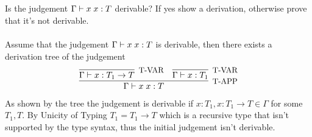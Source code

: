 \subsection{}

Is the judgement $\Gamma \vdash x\;x: T$ derivable? If yes show a
derivation, otherwise prove that it's not derivable.\\~\\
Assume that the judgement $\Gamma \vdash x\;x: T$ is derivable,
then there exists a derivation tree of the judgement
\begin{align*}
	\infer[\text{\small{T-APP}}]
	{\Gamma \vdash \APP{x}{x}: T}
	{
	\infer[\text{\small{T-VAR}}]{\Gamma \vdash x: T_1 \to T}{} &
		\infer[\text{\small{T-VAR}}]{\Gamma \vdash x: T_1}{}
	}
\end{align*}
As shown by the tree the judgement is derivable if
$x: T_1, x: T_1 \to T \in \Gamma$ for some $T_1, T$.
By Unicity of Typing $T_1 = T_1 \to T$ which is a recursive type that isn't
supported by the type syntax, thus the initial judgement isn't derivable.
